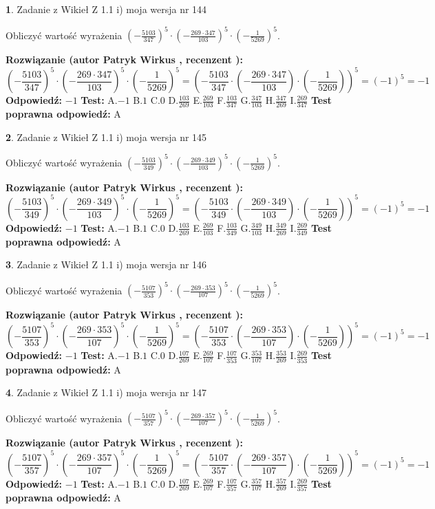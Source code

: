 \documentclass[12pt, a4paper]{article}
\theoremstyle{definition} %
\newtheorem{zad}{}
\newcommand{\zadStart}[1]{\begin{zad}#1\newline}
\newcommand{\zadStop}{\end{zad}}
\newcommand{\rozwStart}[2]{\noindent \textbf{Rozwiązanie (autor #1 , recenzent #2): }\newline}
\newcommand{\rozwStop}{\newline}
\newcommand{\odpStart}{\noindent \textbf{Odpowiedź:}\newline}
\newcommand{\odpStop}{\newline}
\newcommand{\testStart}{\noindent \textbf{Test:}\newline}
\newcommand{\testStop}{\newline}
\newcommand{\kluczStart}{\noindent \textbf{Test poprawna odpowiedź:}\newline}
\newcommand{\kluczStop}{\newline}
\begin{document}
\zadStart{Zadanie z Wikieł Z 1.1 i) moja wersja nr 144}

Obliczyć wartość wyrażenia $(-\frac{5103}{347})^{5} \cdot (-\frac{269 \cdot 347}{103})^{5} \cdot (-\frac{1}{5269})^{5}$.
\zadStop
\rozwStart{Patryk Wirkus}{}
$$(-\frac{5103}{347})^{5} \cdot (-\frac{269 \cdot 347}{103})^{5} \cdot (-\frac{1}{5269})^{5} = (-\frac{5103}{347} \cdot (-\frac{269 \cdot 347}{103}) \cdot (-\frac{1}{5269}))^{5} = (-1)^{5} = -1$$
\rozwStop
\odpStart
$-1$
\odpStop
\testStart
A.$-1$ B.$1$ C.$0$ D.$\frac{103}{269}$ E.$\frac{269}{103}$
F.$\frac{103}{347}$ G.$\frac{347}{103}$
H.$\frac{347}{269}$
I.$\frac{269}{347}$
\testStop
\kluczStart
A
\kluczStop



\zadStart{Zadanie z Wikieł Z 1.1 i) moja wersja nr 145}

Obliczyć wartość wyrażenia $(-\frac{5103}{349})^{5} \cdot (-\frac{269 \cdot 349}{103})^{5} \cdot (-\frac{1}{5269})^{5}$.
\zadStop
\rozwStart{Patryk Wirkus}{}
$$(-\frac{5103}{349})^{5} \cdot (-\frac{269 \cdot 349}{103})^{5} \cdot (-\frac{1}{5269})^{5} = (-\frac{5103}{349} \cdot (-\frac{269 \cdot 349}{103}) \cdot (-\frac{1}{5269}))^{5} = (-1)^{5} = -1$$
\rozwStop
\odpStart
$-1$
\odpStop
\testStart
A.$-1$ B.$1$ C.$0$ D.$\frac{103}{269}$ E.$\frac{269}{103}$
F.$\frac{103}{349}$ G.$\frac{349}{103}$
H.$\frac{349}{269}$
I.$\frac{269}{349}$
\testStop
\kluczStart
A
\kluczStop



\zadStart{Zadanie z Wikieł Z 1.1 i) moja wersja nr 146}

Obliczyć wartość wyrażenia $(-\frac{5107}{353})^{5} \cdot (-\frac{269 \cdot 353}{107})^{5} \cdot (-\frac{1}{5269})^{5}$.
\zadStop
\rozwStart{Patryk Wirkus}{}
$$(-\frac{5107}{353})^{5} \cdot (-\frac{269 \cdot 353}{107})^{5} \cdot (-\frac{1}{5269})^{5} = (-\frac{5107}{353} \cdot (-\frac{269 \cdot 353}{107}) \cdot (-\frac{1}{5269}))^{5} = (-1)^{5} = -1$$
\rozwStop
\odpStart
$-1$
\odpStop
\testStart
A.$-1$ B.$1$ C.$0$ D.$\frac{107}{269}$ E.$\frac{269}{107}$
F.$\frac{107}{353}$ G.$\frac{353}{107}$
H.$\frac{353}{269}$
I.$\frac{269}{353}$
\testStop
\kluczStart
A
\kluczStop



\zadStart{Zadanie z Wikieł Z 1.1 i) moja wersja nr 147}

Obliczyć wartość wyrażenia $(-\frac{5107}{357})^{5} \cdot (-\frac{269 \cdot 357}{107})^{5} \cdot (-\frac{1}{5269})^{5}$.
\zadStop
\rozwStart{Patryk Wirkus}{}
$$(-\frac{5107}{357})^{5} \cdot (-\frac{269 \cdot 357}{107})^{5} \cdot (-\frac{1}{5269})^{5} = (-\frac{5107}{357} \cdot (-\frac{269 \cdot 357}{107}) \cdot (-\frac{1}{5269}))^{5} = (-1)^{5} = -1$$
\rozwStop
\odpStart
$-1$
\odpStop
\testStart
A.$-1$ B.$1$ C.$0$ D.$\frac{107}{269}$ E.$\frac{269}{107}$
F.$\frac{107}{357}$ G.$\frac{357}{107}$
H.$\frac{357}{269}$
I.$\frac{269}{357}$
\testStop
\kluczStart
A
\kluczStop
\end{document}
